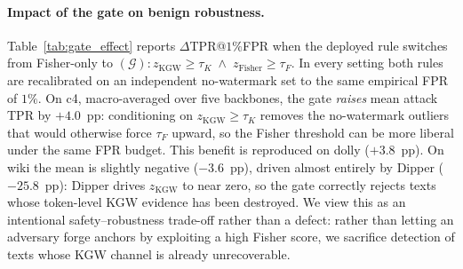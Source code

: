 
\paragraph{Impact of the gate on benign robustness.}
Table~\ref{tab:gate_effect} reports $\Delta$TPR@$1\%$FPR when the deployed
rule switches from Fisher-only to
$(\mathcal{G}): z_{\mathrm{KGW}}\!\ge\!\tau_K \;\wedge\; z_{\mathrm{Fisher}}\!\ge\!\tau_F$.
In every setting both rules are recalibrated on an independent no-watermark
set to the same empirical FPR of $1\%$.
On c4, macro-averaged over five backbones, the gate \emph{raises} mean attack
TPR by $+4.0$~pp: conditioning on $z_{\mathrm{KGW}}\!\ge\!\tau_K$ removes the
no-watermark outliers that would otherwise force $\tau_F$ upward, so the
Fisher threshold can be more liberal under the same FPR budget.
This benefit is reproduced on dolly ($+3.8$~pp).
On wiki the mean is slightly negative ($-3.6$~pp), driven almost entirely by
Dipper ($-25.8$~pp): Dipper drives $z_{\mathrm{KGW}}$ to near zero, so the
gate correctly rejects texts whose token-level KGW evidence has been destroyed.
We view this as an intentional safety--robustness trade-off rather than a
defect: rather than letting an adversary forge anchors by exploiting a high
Fisher score, we sacrifice detection of texts whose KGW channel is already
unrecoverable.
